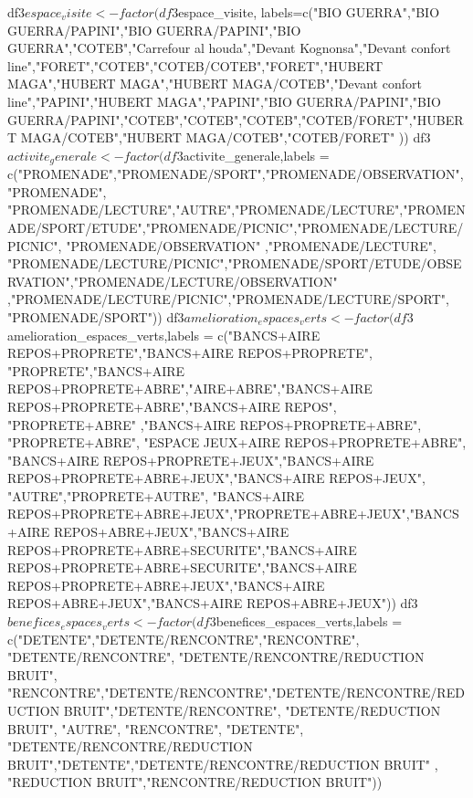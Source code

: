 df3$espace_visite <-factor(df3$espace_visite, labels=c("BIO GUERRA","BIO GUERRA/PAPINI","BIO GUERRA/PAPINI","BIO GUERRA","COTEB","Carrefour al houda","Devant Kognonsa","Devant confort line","FORET","COTEB","COTEB/COTEB","FORET","HUBERT MAGA","HUBERT MAGA","HUBERT MAGA/COTEB","Devant confort line","PAPINI","HUBERT MAGA","PAPINI","BIO GUERRA/PAPINI","BIO GUERRA/PAPINI","COTEB","COTEB","COTEB","COTEB/FORET","HUBERT MAGA/COTEB","HUBERT MAGA/COTEB","COTEB/FORET"
))
df3$activite_generale<-factor(df3$activite_generale,labels = c("PROMENADE","PROMENADE/SPORT","PROMENADE/OBSERVATION","PROMENADE", "PROMENADE/LECTURE","AUTRE","PROMENADE/LECTURE","PROMENADE/SPORT/ETUDE","PROMENADE/PICNIC","PROMENADE/LECTURE/PICNIC", "PROMENADE/OBSERVATION" ,"PROMENADE/LECTURE", "PROMENADE/LECTURE/PICNIC","PROMENADE/SPORT/ETUDE/OBSERVATION","PROMENADE/LECTURE/OBSERVATION" ,"PROMENADE/LECTURE/PICNIC","PROMENADE/LECTURE/SPORT",  "PROMENADE/SPORT"))
df3$amelioration_espaces_verts<-factor(df3$amelioration_espaces_verts,labels = c("BANCS+AIRE REPOS+PROPRETE","BANCS+AIRE REPOS+PROPRETE", "PROPRETE","BANCS+AIRE REPOS+PROPRETE+ABRE","AIRE+ABRE","BANCS+AIRE REPOS+PROPRETE+ABRE","BANCS+AIRE REPOS", "PROPRETE+ABRE" ,"BANCS+AIRE REPOS+PROPRETE+ABRE", "PROPRETE+ABRE", "ESPACE JEUX+AIRE REPOS+PROPRETE+ABRE", "BANCS+AIRE REPOS+PROPRETE+JEUX","BANCS+AIRE REPOS+PROPRETE+ABRE+JEUX","BANCS+AIRE REPOS+JEUX", "AUTRE","PROPRETE+AUTRE", "BANCS+AIRE REPOS+PROPRETE+ABRE+JEUX","PROPRETE+ABRE+JEUX","BANCS+AIRE REPOS+ABRE+JEUX","BANCS+AIRE REPOS+PROPRETE+ABRE+SECURITE","BANCS+AIRE REPOS+PROPRETE+ABRE+SECURITE","BANCS+AIRE REPOS+PROPRETE+ABRE+JEUX","BANCS+AIRE REPOS+ABRE+JEUX","BANCS+AIRE REPOS+ABRE+JEUX"))
df3$benefices_espaces_verts<-factor(df3$benefices_espaces_verts,labels = c("DETENTE","DETENTE/RENCONTRE","RENCONTRE",  "DETENTE/RENCONTRE", "DETENTE/RENCONTRE/REDUCTION BRUIT", "RENCONTRE","DETENTE/RENCONTRE","DETENTE/RENCONTRE/REDUCTION BRUIT","DETENTE/RENCONTRE", "DETENTE/REDUCTION BRUIT", "AUTRE", "RENCONTRE", "DETENTE", "DETENTE/RENCONTRE/REDUCTION BRUIT","DETENTE","DETENTE/RENCONTRE/REDUCTION BRUIT" , "REDUCTION BRUIT","RENCONTRE/REDUCTION BRUIT"))

